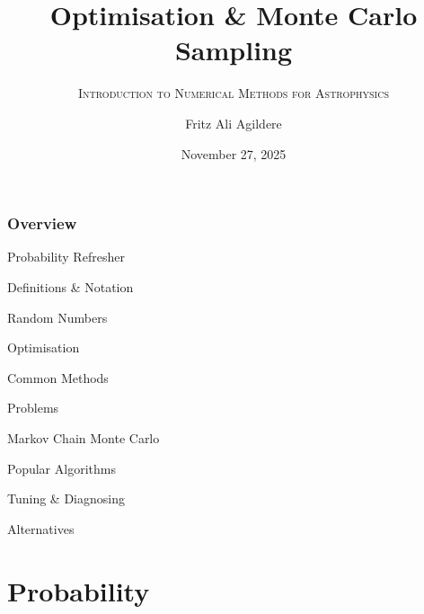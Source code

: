 


\author[F. A. Agildere]{Fritz Ali Agildere}

\date[Nov. 27, 2025]{November 27, 2025}

\title{Optimisation \& Monte Carlo Sampling}
\subtitle{\textsc{Introduction to Numerical Methods for Astrophysics}}

\institute[UNITOV]{}


	\begin{frame}[noframenumbering]
		\titlepage
	\end{frame}

	\begin{frame}
		\frametitle{Overview}
		\begin{customlist}
			\item Probability Refresher
			\begin{customlist}
				\item Definitions \& Notation
				\item Random Numbers
			\end{customlist}
			\item Optimisation
			\begin{customlist}
				\item Common Methods
				\item Problems
			\end{customlist}
			\item Markov Chain Monte Carlo
			\begin{customlist}
				\item Popular Algorithms
				\item Tuning \& Diagnosing
				\item Alternatives
			\end{customlist}
		\end{customlist}
	\end{frame}

	\section{Probability}

